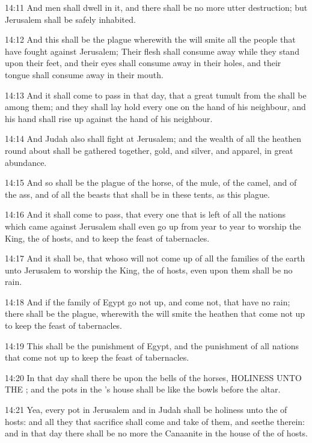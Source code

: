 14:11 And men shall dwell in it, and there shall be no more utter destruction; but Jerusalem shall be safely inhabited.

14:12 And this shall be the plague wherewith the \LORD will smite all the people that have fought against Jerusalem; Their flesh shall consume away while they stand upon their feet, and their eyes shall consume away in their holes, and their tongue shall consume away in their mouth.

14:13 And it shall come to pass in that day, that a great tumult from the \LORD shall be among them; and they shall lay hold every one on the hand of his neighbour, and his hand shall rise up against the hand of his neighbour.

14:14 And Judah also shall fight at Jerusalem; and the wealth of all the heathen round about shall be gathered together, gold, and silver, and apparel, in great abundance.

14:15 And so shall be the plague of the horse, of the mule, of the camel, and of the ass, and of all the beasts that shall be in these tents, as this plague.

14:16 And it shall come to pass, that every one that is left of all the nations which came against Jerusalem shall even go up from year to year to worship the King, the \LORD of hosts, and to keep the feast of tabernacles.

14:17 And it shall be, that whoso will not come up of all the families of the earth unto Jerusalem to worship the King, the \LORD of hosts, even upon them shall be no rain.

14:18 And if the family of Egypt go not up, and come not, that have no rain; there shall be the plague, wherewith the \LORD will smite the heathen that come not up to keep the feast of tabernacles.

14:19 This shall be the punishment of Egypt, and the punishment of all nations that come not up to keep the feast of tabernacles.

14:20 In that day shall there be upon the bells of the horses, HOLINESS UNTO THE \LORD; and the pots in the \LORD's house shall be like the bowls before the altar.

14:21 Yea, every pot in Jerusalem and in Judah shall be holiness unto the \LORD of hosts: and all they that sacrifice shall come and take of them, and seethe therein: and in that day there shall be no more the Canaanite in the house of the \LORD of hosts.

